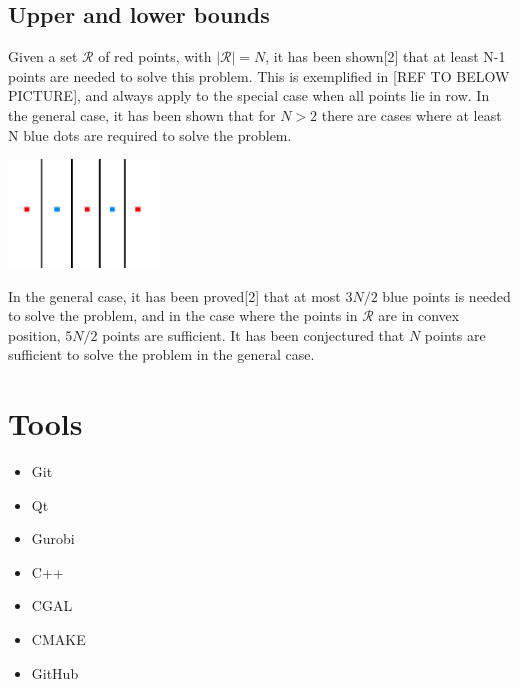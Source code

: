 \documentclass[a4paper,12pt]{article}
\begin{document}
\subsection{Upper and lower bounds}
Given a set $\mathcal{R}$ of red points, with $|\mathcal{R}| = N$, it has been shown[2] that at least N-1 points are needed to solve this problem. This is exemplified in [REF TO BELOW PICTURE], and always apply to the special case when all points lie in row. In the general case, it has been shown that for $N>2$ there are cases where at least N blue dots are required to solve the problem.

\includegraphics[width=0.3\textwidth]{pictures/N-1solution.png}

In the general case, it has been proved[2] that at most $3N/2$ blue points is needed to solve the problem, and in the case where the points in  $\mathcal{R}$ are in convex position, $5N/2$ points are sufficient. It has been conjectured that $N$ points are sufficient to solve the problem in the general case.

\section{Tools}
\begin{itemize}
\item
Git
\item
Qt
\item
Gurobi
\item
C++
\item
CGAL
\item
CMAKE
\item
GitHub
\end{itemize}
\end{document}
